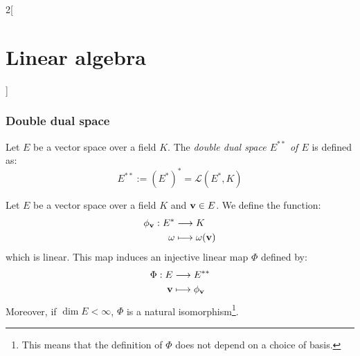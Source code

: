 \documentclass[../../../main.tex]{subfiles}
\begin{document}
\begin{multicols}{2}[\section{Linear algebra}]
\subsubsection*{Double dual space}
\begin{definition}
    Let $E$ be a vector space over a field $K$. The \textit{double dual space $E^{**}$ of $E$} is defined as: $$E^{**}:=({E^*})^*=\mathcal{L}(E^*,K)$$
\end{definition}
\begin{prop}
    Let $E$ be a vector space over a field $K$ and $\vb{v}\in E$. We define the function:
    \begin{align*}
        \phi_{\vb{v}}:E^*&\longrightarrow K\\
        \omega &\longmapsto\omega(\vb{v})
    \end{align*}
    which is linear. This map induces an injective linear map $\Phi$ defined by:
    \begin{align*}
        \Phi:E&\longrightarrow E^{**}\\
        \vb{v}&\longmapsto\phi_{\vb{v}}
    \end{align*}
    Moreover, if $\dim E<\infty$, $\Phi$ is a natural isomorphism\footnote{This means that the definition of $\Phi$ does not depend on a choice of basis.}. 
\end{prop}

\end{multicols}
\end{document}
